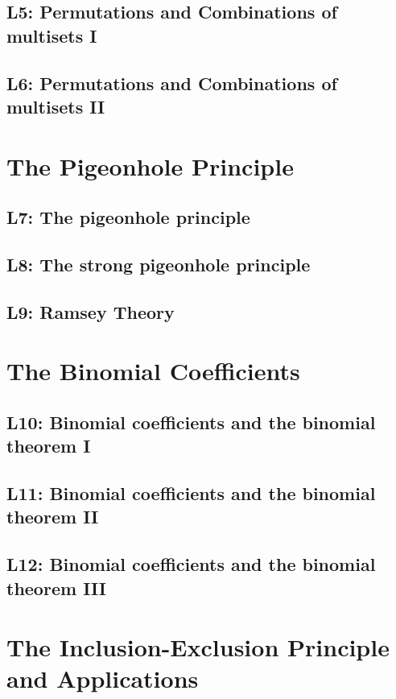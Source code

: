 \documentclass{report}
\begin{document}
\section{L5: Permutations and Combinations of multisets I}

\section{L6: Permutations and Combinations of multisets II}

\chapter{The Pigeonhole Principle}

\section{L7: The pigeonhole principle}

\section{L8: The strong pigeonhole principle}

\section{L9: Ramsey Theory}

\setcounter{chapter}{4}

\chapter{The Binomial Coefficients}

\section{L10: Binomial coefficients and the binomial theorem I}

\section{L11: Binomial coefficients and the binomial theorem II}

\section{L12: Binomial coefficients and the binomial theorem III}

\chapter{The Inclusion-Exclusion Principle and Applications}
\end{document}
